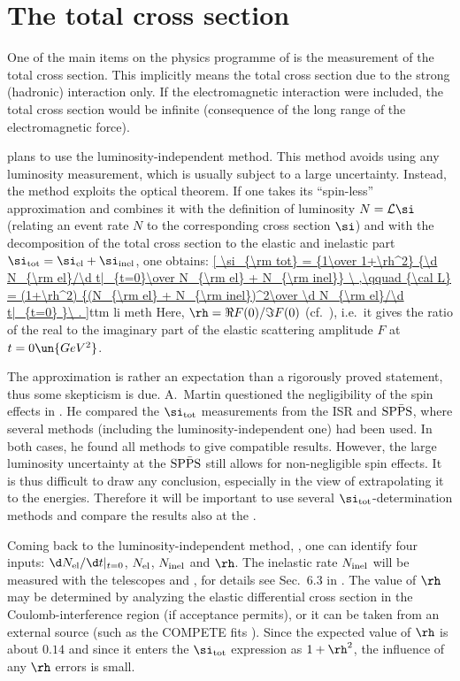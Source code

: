 \section[ttm tcs]{The total cross section}

One of the main items on the physics programme of  is the measurement of the total cross section. This implicitly means the total cross section due to the strong (hadronic) interaction only. If the electromagnetic interaction were included, the total cross section would be infinite (consequence of the long range of the electromagnetic force).

 plans to use the luminosity-independent method. This method avoids using any luminosity measurement, which is usually subject to a large uncertainty. Instead, the method exploits the optical theorem. If one takes its ``spin-less'' approximation  and combines it with the definition of luminosity $N = {\cal L} \si$ (relating an event rate $N$ to the corresponding cross section $\si$) and with the decomposition of the total cross section to the elastic and inelastic part $\si_{\rm tot} = \si_{\rm el} + \si_{\rm inel}$, one obtains:
\eqref{
	\si_{\rm tot} = {1\over 1+\rh^2} {\d N_{\rm el}/\d t|_{t=0}\over N_{\rm el} + N_{\rm inel}}
	\ ,\qquad
	{\cal L} = (1+\rh^2) {(N_{\rm el} + N_{\rm inel})^2\over \d N_{\rm el}/\d t|_{t=0} }\ .
}{ttm li meth}
Here, $\rh = \Re F(0) / \Im F(0)$ (cf.~), i.e.~it gives the ratio of the real to the imaginary part of the elastic scattering amplitude $F$ at $t = 0\un{GeV^2}$.

The approximation  is rather an expectation than a rigorously proved statement, thus some skepticism is due. A.~Martin questioned the negligibility of the spin effects in . He compared the $\si_{\rm tot}$ measurements from the ISR and $\rm SP\bar PS$, where several methods (including the luminosity-independent one) had been used. In both cases, he found all methods to give compatible results. However, the large luminosity uncertainty at the $\rm SP\bar PS$ still allows for non-negligible spin effects. It is thus difficult to draw any conclusion, especially in the view of extrapolating it to the  energies. Therefore it will be important to use several $\si_{\rm tot}$-determination methods and compare the results also at the .

Coming back to the luminosity-independent method, , one can identify four inputs: $\d N_{\rm el}/\d t|_{t=0}$, $N_{\rm el}$, $N_{\rm inel}$ and $\rh$. The inelastic rate $N_{\rm inel}$ will be measured with the telescopes  and , for details see Sec.~6.3 in . The value of $\rh$ may be determined by analyzing the elastic differential cross section in the Coulomb-interference region (if acceptance permits), or it can be taken from an external source (such as the COMPETE fits ). Since the expected value of $\rh$ is about $0.14$ and since it enters the $\si_{\rm tot}$ expression as $1 + \rh^2$, the influence of any $\rh$ errors is small.

